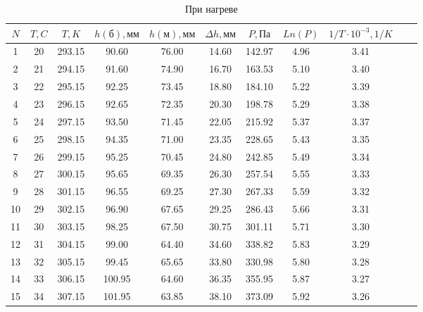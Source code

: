 \documentclass[a4paper,11.5pt]{article} %
\begin{document}
\begin{center}
\begin{table}[h]
		\caption{При нагреве}
\begin{tabular}{|c|c|c|c|c|c|c|c|c|c|c|} \hline
$N$ & $T, C$ & $T, K$ & $h(\text{б}), \text{мм}$ & $h(\text{м}), \text{мм}$ & $\Delta h, \text{мм}$ & $P, Па$ & $Ln(P)$ & $1/T\cdot10^{-3}, 1/K$ \\ \hline
 1 & 20 & 293.15 &  90.60 & 76.00 & 14.60 & 142.97 & 4.96 & 3.41  \\ \hline
 2 & 21 & 294.15 &  91.60 & 74.90 & 16.70 & 163.53 & 5.10 & 3.40  \\ \hline 
 3 & 22 & 295.15 &  92.25 & 73.45 & 18.80 & 184.10 & 5.22 & 3.39  \\ \hline
 4 & 23 & 296.15 &  92.65 & 72.35 & 20.30 & 198.78 & 5.29 & 3.38  \\ \hline
 5 & 24 & 297.15 &  93.50 & 71.45 & 22.05 & 215.92 & 5.37 & 3.37  \\ \hline
 6 & 25 & 298.15 &  94.35 & 71.00 & 23.35 & 228.65 & 5.43 & 3.35  \\ \hline
 7 & 26 & 299.15 &  95.25 & 70.45 & 24.80 & 242.85 & 5.49 & 3.34  \\ \hline
 8 & 27 & 300.15 &  95.65 & 69.35 & 26.30 & 257.54 & 5.55 & 3.33  \\ \hline
 9 & 28 & 301.15 &  96.55 & 69.25 & 27.30 & 267.33 & 5.59 & 3.32  \\ \hline
10 & 29 & 302.15 &  96.90 & 67.65 & 29.25 & 286.43 & 5.66 & 3.31  \\ \hline
11 & 30 & 303.15 &  98.25 & 67.50 & 30.75 & 301.11 & 5.71 & 3.30  \\ \hline
12 & 31 & 304.15 &  99.00 & 64.40 & 34.60 & 338.82 & 5.83 & 3.29  \\ \hline
13 & 32 & 305.15 &  99.45 & 65.65 & 33.80 & 330.98 & 5.80 & 3.28  \\ \hline
14 & 33 & 306.15 & 100.95 & 64.60 & 36.35 & 355.95 & 5.87 & 3.27  \\ \hline
15 & 34 & 307.15 & 101.95 & 63.85 & 38.10 & 373.09 & 5.92 & 3.26  \\ \hline
\end{tabular}

\end{table}
\end{center}
\end{document}
